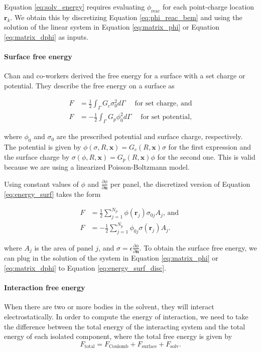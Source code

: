 Equation \eqref{eq:solv_energy} requires evaluating $\phi_{\text{reac}}$ for each point-charge location $\mathbf{r}_k$. We obtain this by discretizing Equation \eqref{eq:phi_reac_bem} and using the solution of the linear system in Equation \eqref{eq:matrix_phi} or Equation \eqref{eq:matrix_dphi} as inputs.

\medskip
\paragraph*{Surface free energy}

Chan and co-workers \cite{ChanMitchell1983,CarnieChan1993} derived the free energy for a surface with a set charge or potential. They describe the free energy on a surface as

\begin{align} \label{eq:energy_surf}
F &= \frac{1}{2} \int_{\Gamma} G_c \sigma_0^2 d\Gamma \quad \text{ for set charge, and} \nonumber \\
F &= -\frac{1}{2} \int_{\Gamma} G_p \phi_0^2 d\Gamma \quad \text{ for set potential,}
\end{align} 

\noindent where $\phi_0$ and $\sigma_0$ are the prescribed potential and surface charge, respectively. The potential is given by $\phi(\sigma, R, \mathbf{x}) = G_c(R, \mathbf{x}) \sigma$ for the first expression and the surface charge by $\sigma(\phi, R, \mathbf{x}) = G_p(R, \mathbf{x}) \phi$ for the second one. This is valid because we are using a linearized Poisson-Boltzmann model.

Using constant values of $\phi$ and $\frac{\partial \phi}{\partial \mathbf{n}}$ per panel, the discretized version of Equation \eqref{eq:energy_surf} takes the form

\begin{align} \label{eq:energy_surf_disc}
F &= \frac{1}{2} \sum_{j=1}^{N_p} \phi(\mathbf{r}_j) \sigma_{0j} A_j \text{, and } \nonumber \\
F &= -\frac{1}{2} \sum_{j=1}^{N_p} \phi_{0j} \sigma(\mathbf{r}_j) A_j. 
\end{align}

\noindent where $A_j$ is the area of panel $j$, and $\sigma = \epsilon \frac{\partial \phi}{\partial \mathbf{n}}$. To obtain the surface free energy, we can plug in the solution of the system in Equation \eqref{eq:matrix_phi} or \eqref{eq:matrix_dphi} to Equation \eqref{eq:energy_surf_disc}. 

\medskip
\paragraph*{Interaction free energy}
When there are two or more bodies in the solvent, they will interact electrostatically. In order to compute the energy of interaction, we need to take the difference between the total energy of the interacting system and the total energy of each isolated component, where the total free energy is given by
%
\begin{equation} \label{eq:total_energy}
F_{\text{total}} = F_{\text{Coulomb}} + F_{\text{surface}} + F_{\text{solv}}.
\end{equation}

